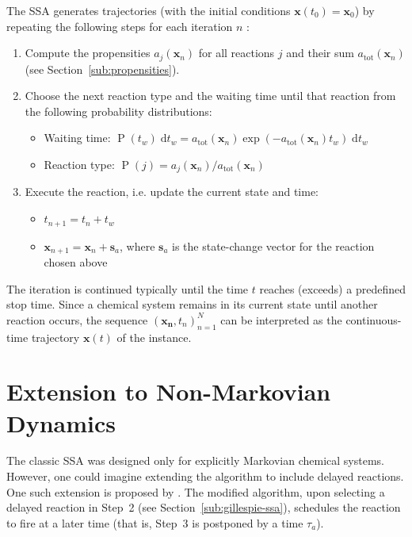 \documentclass[english,letterpaper,12pt]{report}
\newcommand{\dee}{\;\mathrm{d}}
\renewcommand{\vec}[1]{\ensuremath{\mathbf{#1}}}
\DeclareMathOperator{\Prob}{P}
\begin{document}
\begin{doublespacing}
The SSA generates trajectories (with the initial conditions $\vec{x}(t_0) = \vec{x}_0$) by repeating the following steps for each iteration $n$ \cite{gillespie-ssa}:
\begin{enumerate}
    \item Compute the propensities $a_j(\vec{x}_n)$ for all reactions $j$ and their sum $a_\text{tot}(\vec{x}_n)$ (see Section~\ref{sub:propensities}).
    \item Choose the next reaction type and the waiting time until that reaction from the following probability distributions:
    \begin{itemize}
        \item Waiting time: $\Prob(t_w)\dee t_w = a_\text{tot}(\vec{x}_n) \exp(-a_\text{tot}(\vec{x}_n) t_w) \dee t_w$
        \item Reaction type: $\Prob(j) = a_j(\vec{x}_n) / a_\text{tot}(\vec{x}_n)$
    \end{itemize}
    \item Execute the reaction, i.e. update the current state and time:
    \begin{itemize}
        \item $t_{n+1} = t_n + t_w$
        \item $\vec{x}_{n+1} = \vec{x}_n + \vec{s}_a$, where $\vec{s}_a$ is the state-change vector for the reaction chosen above
    \end{itemize}
\end{enumerate}
The iteration is continued typically until the time $t$ reaches (exceeds) a predefined stop time. Since a chemical system remains in its current state until another reaction occurs, the sequence $\left(\vec{x_n}, t_n\right)_{n=1}^N$ can be interpreted as the continuous-time trajectory $\vec{x}(t)$ of the instance.



\section{Extension to Non-Markovian Dynamics} %
\label{sub:non-markovian}

The classic SSA was designed only for explicitly Markovian chemical systems. However, one could imagine extending the algorithm to include delayed reactions. One such extension is proposed by \cite{delay-oscillations}. The modified algorithm, upon selecting a delayed reaction in Step~2 (see Section~\ref{sub:gillespie-ssa}), schedules the reaction to fire at a later time (that is, Step~3 is postponed by a time $\tau_a$). 


\end{doublespacing}
\end{document}
